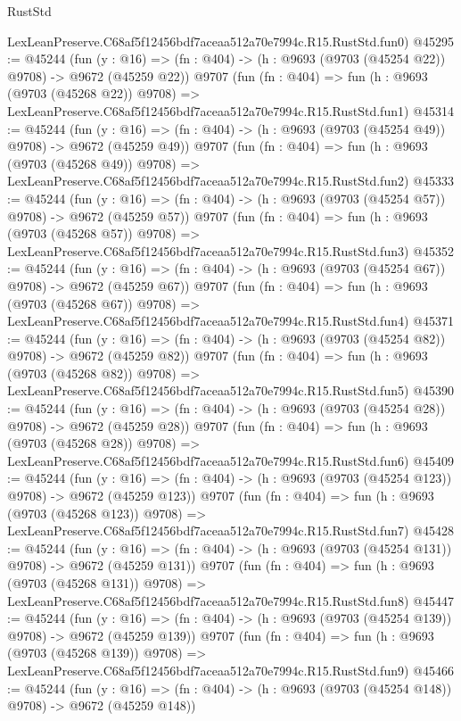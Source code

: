 \begin{lexlean}{RustStd}
\begin{coremodule}
    LexLeanPreserve.C68af5f12456bdf7aceaa512a70e7994c.R15.RustStd.fun0)
@45295 := @45244
    (fun (y : @16) => (fn : @404) -> (h : @9693 (@9703 (@45254 @22)) @9708) -> @9672 (@45259 @22))
    @9707
    (fun (fn : @404) =>
    fun (h : @9693 (@9703 (@45268 @22)) @9708) =>
    LexLeanPreserve.C68af5f12456bdf7aceaa512a70e7994c.R15.RustStd.fun1)
@45314 := @45244
    (fun (y : @16) => (fn : @404) -> (h : @9693 (@9703 (@45254 @49)) @9708) -> @9672 (@45259 @49))
    @9707
    (fun (fn : @404) =>
    fun (h : @9693 (@9703 (@45268 @49)) @9708) =>
    LexLeanPreserve.C68af5f12456bdf7aceaa512a70e7994c.R15.RustStd.fun2)
@45333 := @45244
    (fun (y : @16) => (fn : @404) -> (h : @9693 (@9703 (@45254 @57)) @9708) -> @9672 (@45259 @57))
    @9707
    (fun (fn : @404) =>
    fun (h : @9693 (@9703 (@45268 @57)) @9708) =>
    LexLeanPreserve.C68af5f12456bdf7aceaa512a70e7994c.R15.RustStd.fun3)
@45352 := @45244
    (fun (y : @16) => (fn : @404) -> (h : @9693 (@9703 (@45254 @67)) @9708) -> @9672 (@45259 @67))
    @9707
    (fun (fn : @404) =>
    fun (h : @9693 (@9703 (@45268 @67)) @9708) =>
    LexLeanPreserve.C68af5f12456bdf7aceaa512a70e7994c.R15.RustStd.fun4)
@45371 := @45244
    (fun (y : @16) => (fn : @404) -> (h : @9693 (@9703 (@45254 @82)) @9708) -> @9672 (@45259 @82))
    @9707
    (fun (fn : @404) =>
    fun (h : @9693 (@9703 (@45268 @82)) @9708) =>
    LexLeanPreserve.C68af5f12456bdf7aceaa512a70e7994c.R15.RustStd.fun5)
@45390 := @45244
    (fun (y : @16) => (fn : @404) -> (h : @9693 (@9703 (@45254 @28)) @9708) -> @9672 (@45259 @28))
    @9707
    (fun (fn : @404) =>
    fun (h : @9693 (@9703 (@45268 @28)) @9708) =>
    LexLeanPreserve.C68af5f12456bdf7aceaa512a70e7994c.R15.RustStd.fun6)
@45409 := @45244
    (fun (y : @16) => (fn : @404) -> (h : @9693 (@9703 (@45254 @123)) @9708) -> @9672 (@45259 @123))
    @9707
    (fun (fn : @404) =>
    fun (h : @9693 (@9703 (@45268 @123)) @9708) =>
    LexLeanPreserve.C68af5f12456bdf7aceaa512a70e7994c.R15.RustStd.fun7)
@45428 := @45244
    (fun (y : @16) => (fn : @404) -> (h : @9693 (@9703 (@45254 @131)) @9708) -> @9672 (@45259 @131))
    @9707
    (fun (fn : @404) =>
    fun (h : @9693 (@9703 (@45268 @131)) @9708) =>
    LexLeanPreserve.C68af5f12456bdf7aceaa512a70e7994c.R15.RustStd.fun8)
@45447 := @45244
    (fun (y : @16) => (fn : @404) -> (h : @9693 (@9703 (@45254 @139)) @9708) -> @9672 (@45259 @139))
    @9707
    (fun (fn : @404) =>
    fun (h : @9693 (@9703 (@45268 @139)) @9708) =>
    LexLeanPreserve.C68af5f12456bdf7aceaa512a70e7994c.R15.RustStd.fun9)
@45466 := @45244
    (fun (y : @16) => (fn : @404) -> (h : @9693 (@9703 (@45254 @148)) @9708) -> @9672 (@45259 @148))

\end{coremodule}
\end{lexlean}
